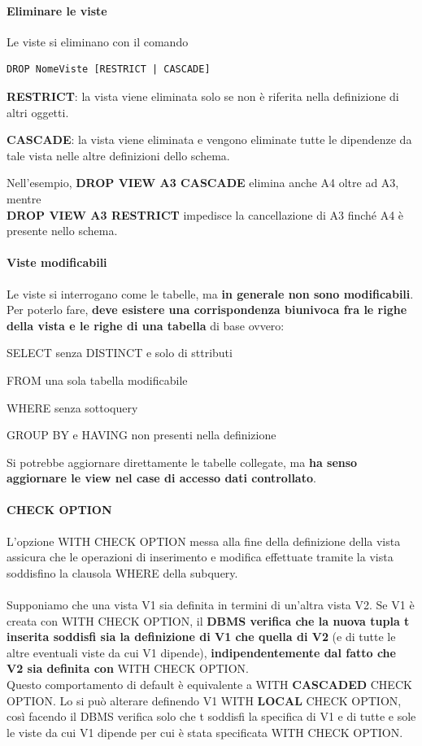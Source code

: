 \documentclass[10pt]{book}
\begin{document}
\paragraph{Eliminare le viste} Le viste si eliminano con il comando
\begin{lstlisting}
DROP NomeViste [RESTRICT | CASCADE]
\end{lstlisting}
\begin{list}{}{}
	\item \textbf{RESTRICT}: la vista viene eliminata solo se non è riferita nella definizione di altri oggetti.
	\item \textbf{CASCADE}: la vista viene eliminata e vengono eliminate tutte le dipendenze da tale vista nelle altre definizioni dello schema.
\end{list}
Nell'esempio, \textbf{DROP VIEW A3 CASCADE} elimina anche A4 oltre ad A3, mentre\\\textbf{DROP VIEW A3 RESTRICT} impedisce la cancellazione di A3 finché A4 è presente nello schema.
\paragraph{Viste modificabili} Le viste si interrogano come le tabelle, ma \textbf{in generale non sono modificabili}. Per poterlo fare, \textbf{deve esistere una corrispondenza biunivoca fra le righe della vista e le righe di una tabella} di base ovvero:
\begin{list}{}{}
	\item SELECT senza DISTINCT e solo di sttributi
	\item FROM una sola tabella modificabile
	\item WHERE senza sottoquery
	\item GROUP BY e HAVING non presenti nella definizione
\end{list}
Si potrebbe aggiornare direttamente le tabelle collegate, ma \textbf{ha senso aggiornare le view nel case di accesso dati controllato}.
\paragraph{CHECK OPTION} L'opzione WITH CHECK OPTION messa alla fine della definizione della vista assicura che le operazioni di inserimento e modifica effettuate tramite la vista soddisfino la clausola WHERE della subquery.\\\\
Supponiamo che una vista V1 sia definita in termini di un'altra vista V2. Se V1 è creata con WITH CHECK OPTION, il \textbf{DBMS verifica che la nuova tupla t inserita soddisfi sia la definizione di V1 che quella di V2} (e di tutte le altre eventuali viste da cui V1 dipende), \textbf{indipendentemente dal fatto che V2 sia definita con} WITH CHECK OPTION.\\
Questo comportamento di default è equivalente a WITH \textbf{CASCADED} CHECK OPTION. Lo si può alterare definendo V1 WITH \textbf{LOCAL} CHECK OPTION, così facendo il DBMS verifica solo che t soddisfi la specifica di V1 e di tutte e sole le viste da cui V1 dipende per cui è stata specificata WITH CHECK OPTION.
\end{document}
